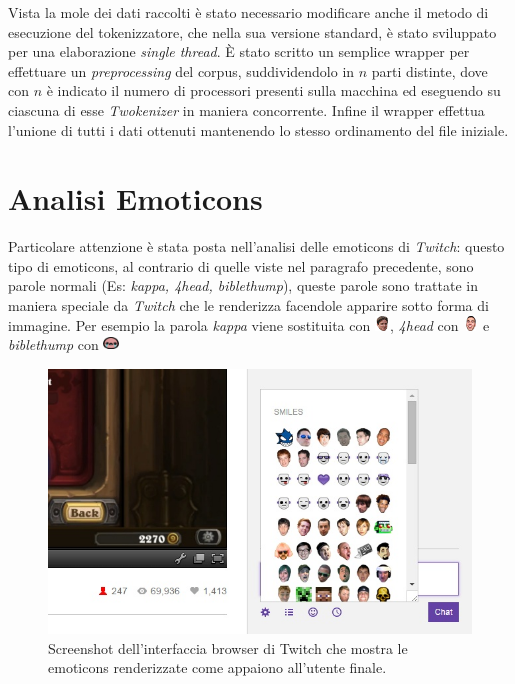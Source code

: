 \documentclass[a4paper,12pt,openright,twoside]{report}
\theoremstyle{definition}
\begin{document}
Vista la mole dei dati raccolti è stato necessario modificare anche il metodo di esecuzione del tokenizzatore, 
che nella sua versione standard, è stato sviluppato per una elaborazione \emph{single thread}.
\`E stato scritto un semplice wrapper per effettuare un \emph{preprocessing} del corpus, 
suddividendolo in $n$ parti distinte, dove con $n$ è indicato il numero di processori presenti 
sulla macchina ed
eseguendo su ciascuna di esse \emph{Twokenizer} in maniera concorrente.
Infine il wrapper effettua l'unione di tutti i dati ottenuti mantenendo lo stesso 
ordinamento del file iniziale.

\section{Analisi Emoticons}
Particolare attenzione è stata posta nell'analisi delle emoticons di \emph{Twitch}: questo tipo di emoticons,
al contrario di quelle viste nel paragrafo precedente, sono parole normali (Es: \emph{kappa, 4head, biblethump}),
queste parole sono trattate in maniera speciale da \emph{Twitch} che le renderizza facendole apparire sotto forma di immagine.
Per esempio la parola \emph{kappa} viene sostituita con 
\includegraphics[height=0.4cm, width=0.4cm]{Immagini/Emoticons/kappahd.png}, 
\emph{4head} con \includegraphics[height=0.4cm, width=0.4cm]{Immagini/Emoticons/4head.png} e 
\emph{biblethump} con
\includegraphics[height=0.4cm, width=0.4cm]{Immagini/Emoticons/biblethump.png} 

\begin{figure}[ht]
	\centering
	\includegraphics[scale=0.5]{Immagini/TwitchEmotes.jpg}
	\caption{Screenshot dell'interfaccia browser di Twitch che mostra le emoticons renderizzate
	come appaiono all'utente finale.}
	\label{fig:TwitchEmotes}
\end{figure}
\end{document}
